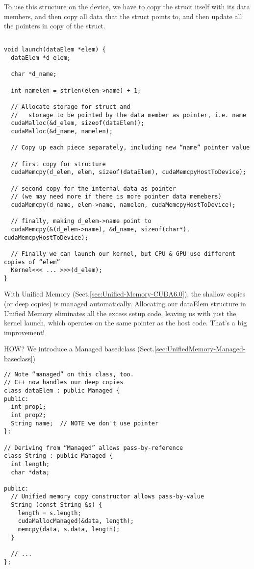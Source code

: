 To use this structure on the device, we have to copy the struct itself with its
data members, and then copy all data that the struct points to, and then update
all the pointers in copy of the struct.

\begin{lstlisting}

void launch(dataElem *elem) {
  dataElem *d_elem;
 
  char *d_name;

  int namelen = strlen(elem->name) + 1;

  // Allocate storage for struct and 
  //   storage to be pointed by the data member as pointer, i.e. name
  cudaMalloc(&d_elem, sizeof(dataElem));
  cudaMalloc(&d_name, namelen);

  // Copy up each piece separately, including new “name” pointer value
  
  // first copy for structure
  cudaMemcpy(d_elem, elem, sizeof(dataElem), cudaMemcpyHostToDevice);
  
  // second copy for the internal data as pointer
  // (we may need more if there is more pointer data memebers)
  cudaMemcpy(d_name, elem->name, namelen, cudaMemcpyHostToDevice);
  
  // finally, making d_elem->name point to 
  cudaMemcpy(&(d_elem->name), &d_name, sizeof(char*), cudaMemcpyHostToDevice);

  // Finally we can launch our kernel, but CPU & GPU use different copies of “elem”
  Kernel<<< ... >>>(d_elem);
}
\end{lstlisting}


With Unified Memory (Sect.\ref{sec:Unified-Memory-CUDA6.0}), the shallow copies
(or deep copies) is managed automatically. Allocating our dataElem structure in
Unified Memory eliminates all the excess setup code, leaving us with just the
kernel launch, which operates on the same pointer as the host code. That’s a big
improvement!

HOW? We introduce a Managed basedclass (Sect.\ref{sec:UnifiedMemory-Managed-baseclass})
\begin{lstlisting}
// Note “managed” on this class, too.
// C++ now handles our deep copies
class dataElem : public Managed {
public:
  int prop1;
  int prop2;
  String name;  // NOTE we don't use pointer
};

// Deriving from “Managed” allows pass-by-reference
class String : public Managed {
  int length;
  char *data;

public:
  // Unified memory copy constructor allows pass-by-value
  String (const String &s) {
    length = s.length;
    cudaMallocManaged(&data, length);
    memcpy(data, s.data, length);
  }

  // ...
};
\end{lstlisting}

